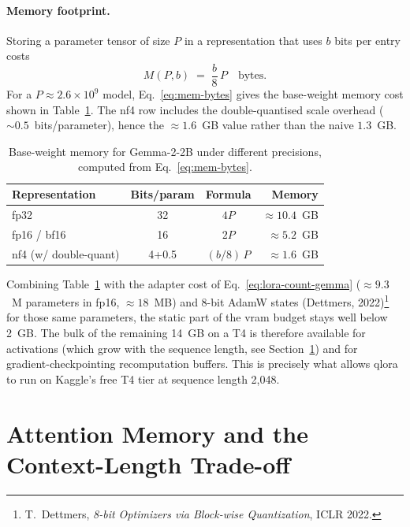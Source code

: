 \documentclass[12pt, a4paper]{report}
\begin{document}
\paragraph{Memory footprint.} Storing a parameter tensor of size \(P\) in
a representation that uses \(b\) bits per entry costs
\begin{equation}
  M(P, b) \;=\; \frac{b}{8}\,P \quad \text{bytes}.
  \label{eq:mem-bytes}
\end{equation}
For a \(P \approx 2.6 \times 10^{9}\) model, Eq.~\eqref{eq:mem-bytes}
gives the base-weight memory cost shown in
Table~\ref{tab:vram-budget}. The \gls{nf4} row includes the
double-quantised scale overhead ($\sim 0.5$~bits/parameter), hence the
\(\approx 1.6\)~GB value rather than the naive \(1.3\)~GB.

\begin{table}[H]
  \centering
  \caption{Base-weight memory for Gemma-2-2B under different precisions,
           computed from Eq.~\eqref{eq:mem-bytes}.}
  \label{tab:vram-budget}
  \begin{tabular}{@{}lccr@{}}
    \toprule
    \textbf{Representation} & \textbf{Bits/param} & \textbf{Formula} & \textbf{Memory} \\
    \midrule
    fp32                       & 32   & \(4 P\)           & \(\approx 10.4\)~GB \\
    fp16 / bf16                & 16   & \(2 P\)           & \(\approx 5.2\)~GB  \\
    \gls{nf4} (w/ double-quant) & 4{+}0.5 & \((b/8)\,P\) & \(\approx 1.6\)~GB  \\
    \bottomrule
  \end{tabular}
\end{table}

Combining Table~\ref{tab:vram-budget} with the adapter cost of
Eq.~\eqref{eq:lora-count-gemma} (\(\approx 9.3\)~M parameters in fp16,
\(\approx 18\)~MB) and 8-bit AdamW states
(Dettmers, 2022)\footnote{T.~Dettmers, \emph{8-bit Optimizers via
Block-wise Quantization}, ICLR 2022.} for those same parameters, the
static part of the \gls{vram} budget stays well below 2~GB. The bulk of
the remaining 14~GB on a T4 is therefore available for activations
(which grow with the sequence length, see
Section~\ref{sec:attn-memory}) and for gradient-checkpointing
recomputation buffers. This is precisely what allows \gls{qlora} to
run on Kaggle's free T4 tier at sequence length 2{,}048.

\section{Attention Memory and the Context-Length Trade-off}
\label{sec:attn-memory}
\end{document}
